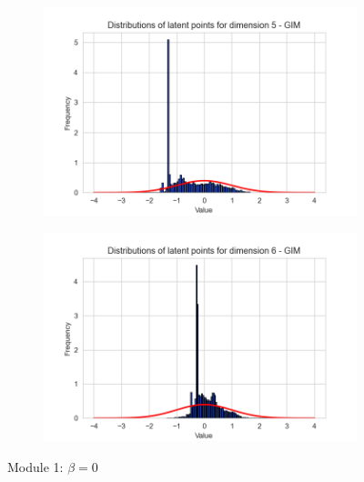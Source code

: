 \begin{figure}[h]
\begin{subfigure}[b]{0.25\textwidth}
	\end{subfigure}
	\hfill
	\begin{subfigure}[b]{0.25\textwidth}
		\centering
		\includegraphics[width=1\linewidth]{"graphs/distr/module1 kld0/_ distribution_latent_space_GIM_dim=4"}
	\end{subfigure}
	\hfill
	\begin{subfigure}[b]{0.25\textwidth}
		\centering
		\includegraphics[width=1\linewidth]{"graphs/distr/module1 kld0/_ distribution_latent_space_GIM_dim=5"}
	\end{subfigure}
	\caption{Module 1: $\beta=0$}
\end{figure}
